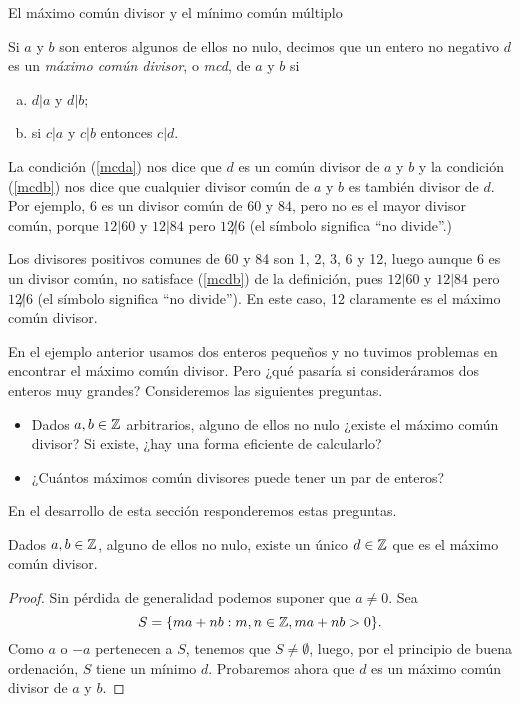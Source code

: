 \begin{section}{El máximo común divisor y el mínimo común
múltiplo}\label{1.7}

\begin{definicion}\label{mcd} Si $a$ y $b$ son enteros algunos de ellos no nulo, decimos que un entero no negativo $d$ es un {\em máximo común divisor}, o {\em mcd}, de $a$ y $b$ si
\begin{enumerate}[a)]
\item\label{mcda} $ d|a$  y $d|b$;
\item\label{mcdb}  si $ c|a $ y $c|b$ entonces $ c|d$.
\end{enumerate}
\end{definicion}
La condición (\ref{mcda}) nos dice que $d$ es un común divisor de $a$ y $b$ y la condición (\ref{mcdb}) nos dice que cualquier divisor común de
$a$ y $b$ es también divisor de $d$. Por ejemplo, $6$ es un divisor común de $60$ y $84$, pero no es el mayor divisor común, porque
$12|60$ y $12|84$ pero $12{\not|}6$ (el símbolo significa ``no divide''.)



\begin{ejemplo} \label{ejem-1-mcd}
	Los divisores positivos comunes de 60  y 84 son 1, 2, 3, 6 y 12, luego aunque 6  es un divisor común, no satisface (\ref{mcdb}) de la definición, pues $12|60$ y $12|84$ pero $12{\not|}6$ (el símbolo significa ``no divide''). En este caso, 12  claramente es  el  máximo común divisor.
\end{ejemplo}

En el ejemplo anterior usamos dos enteros pequeños y no tuvimos problemas en encontrar el  máximo común divisor. Pero ¿qué pasaría si consideráramos dos enteros muy grandes? Consideremos las siguientes preguntas.
\begin{itemize}
	\item Dados $a,b \in {\mathbb Z}$ arbitrarios, alguno de ellos no nulo ¿existe el máximo común divisor? Si existe, ¿hay una forma eficiente de calcularlo?
	\item  ¿Cuántos máximos común divisores puede tener un  par de enteros?
\end{itemize}
En  el desarrollo de esta sección responderemos estas preguntas. 


\begin{teorema}
	Dados $a,b \in {\mathbb Z}$, alguno de ellos no nulo, existe un único $d \in {\mathbb Z}$ que es el máximo común divisor. 
\end{teorema}
\begin{proof}
	Sin pérdida de generalidad podemos suponer que  $a \ne 0$. Sea 
	\begin{equation*}
	S = \{m a+n b : m,n\in {\mathbb Z}, m a+n b>0\}.
	\end{equation*}
	Como  $a$ o $-a$ pertenecen a $S$, tenemos que  $S \not= \emptyset$, luego, por el principio de buena ordenación, $S$ tiene un  mínimo $d$. Probaremos ahora que  $d$  es un  máximo común divisor de $a$ y $b$. 
	

\end{proof}
\end{section}
